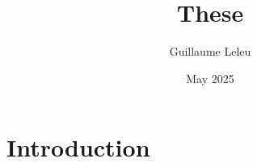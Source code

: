 \documentclass[french,12pt,a4paper]{report}
\title{These}
\author{Guillaume Leleu}
\date{May 2025}
\begin{document}
\maketitle

\section{Introduction}
\end{document}
